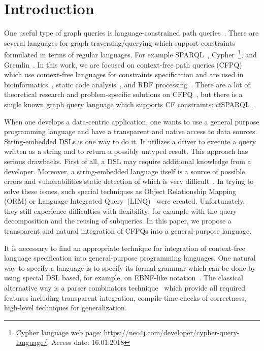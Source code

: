 \section{Introduction}

One useful type of graph queries is language-constrained path queries~\cite{FLCpathProblem}.
There are several languages for graph traversing/querying which support constraints formulated in terms of regular languages.
For example SPARQL~\cite{sparql}, Cypher~\footnote{Cypher language web page: \url{https://neo4j.com/developer/cypher-query-language/}. Access date: 16.01.2018}, and Gremlin~\cite{gremlin}.
In this work, we are focused on context-free path queries (CFPQ) which use context-free languages for constraints specification and are used in bioinformatics~\cite{GraphQueryWithEarley}, static code analysis~\cite{Reps, Zheng, LabelFlowCFLReachability, specificationCFLReachability, JavaCFL}, and RDF processing~\cite{CFGonRDF}. 
There are a lot of theoretical research and problem-specific solutions on CFPQ~\cite{Yannakakis, ConjCFPathQuery, Hellings16, QueryGraphWithData, RegularDBQuery, GraphQueryWithEarley, graphDB}, but there is a single known graph query language which supports CF constraints: cfSPARQL~\cite{CFGonRDF}.

When one develops a data-centric application, one wants to use a general purpose programming language and have a transparent and native access to data sources.
String-embedded DSLs is one way to do it. 
It utilizes a driver to execute a query written as a string and to return a possibly untyped result. 
This approach has serious drawbacks.
First of all, a DSL may require additional knowledge from a developer.
Moreover, a string-embedded language itself is a source of possible errors and vulnerabilities static detection of which is very difficult~\cite{stringEmbeddedLanguagesProblem}.  
In trying to solve these issues, such special techniques as Object Relationship Mapping (ORM) or Language Integrated Query~(LINQ)~\cite{LINQ1, LINQ2, LinqRDF} were created. Unfortunately, they still experience difficulties with flexibility: for example with the query decomposition and the reusing of subqueries.
In this paper, we propose a transparent and natural integration of CFPQs into a general-purpose language. 

It is necessary to find an appropriate technique for integration of context-free language specification into general-purpose programming languages.
One natural way to specify a language is to specify its formal grammar which can be done by using special DSL based, for example, on EBNF-like notation~\cite{EBNFISO}.
The classical alternative way is a parser combinators technique~\cite{MonadicPArserCombinators} which provide all required features including transparent integration, compile-time checks of correctness, high-level techniques for generalization.

